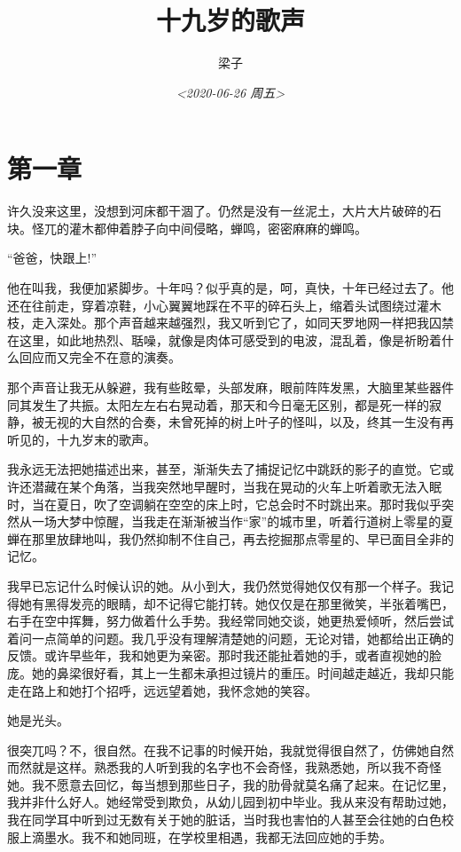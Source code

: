 \documentclass[lang=cn]{elegantpaper}
\author{梁子}
\date{\textit{<2020-06-26 周五>}}
\title{十九岁的歌声}
\begin{document}
\maketitle
\tableofcontents




\section{第一章}
\label{sec:orgef9c603}

许久没来这里，没想到河床都干涸了。仍然是没有一丝泥土，大片大片破碎的石块。怪兀的灌木都伸着脖子向中间侵略，蝉鸣，密密麻麻的蝉鸣。

“爸爸，快跟上!”

他在叫我，我便加紧脚步。十年吗？似乎真的是，呵，真快，十年已经过去了。他还在往前走，穿着凉鞋，小心翼翼地踩在不平的碎石头上，缩着头试图绕过灌木枝，走入深处。那个声音越来越强烈，我又听到它了，如同天罗地网一样把我囚禁在这里，如此地热烈、聒噪，就像是肉体可感受到的电波，混乱着，像是祈盼着什么回应而又完全不在意的演奏。

那个声音让我无从躲避，我有些眩晕，头部发麻，眼前阵阵发黑，大脑里某些器件同其发生了共振。太阳左左右右晃动着，那天和今日毫无区别，都是死一样的寂静，被无视的大自然的合奏，未曾死掉的树上叶子的怪叫，以及，终其一生没有再听见的，十九岁末的歌声。

我永远无法把她描述出来，甚至，渐渐失去了捕捉记忆中跳跃的影子的直觉。它或许还潜藏在某个角落，当我突然地早醒时，当我在晃动的火车上听着歌无法入眠时，当在夏日，吹了空调躺在空空的床上时，它总会时不时跳出来。那时我似乎突然从一场大梦中惊醒，当我走在渐渐被当作“家”的城市里，听着行道树上零星的夏蝉在那里放肆地叫，我仍然抑制不住自己，再去挖掘那点零星的、早已面目全非的记忆。

我早已忘记什么时候认识的她。从小到大，我仍然觉得她仅仅有那一个样子。我记得她有黑得发亮的眼睛，却不记得它能打转。她仅仅是在那里微笑，半张着嘴巴，右手在空中挥舞，努力做着什么手势。我经常同她交谈，她更热爱倾听，然后尝试着问一点简单的问题。我几乎没有理解清楚她的问题，无论对错，她都给出正确的反馈。或许早些年，我和她更为亲密。那时我还能扯着她的手，或者直视她的脸庞。她的鼻梁很好看，其上一生都未承担过镜片的重压。时间越走越近，我却只能走在路上和她打个招呼，远远望着她，我怀念她的笑容。

她是光头。

很突兀吗？不，很自然。在我不记事的时候开始，我就觉得很自然了，仿佛她自然而然就是这样。熟悉我的人听到我的名字也不会奇怪，我熟悉她，所以我不奇怪她。我不愿意去回忆，每当想到那些日子，我的肋骨就莫名痛了起来。在记忆里，我并非什么好人。她经常受到欺负，从幼儿园到初中毕业。我从来没有帮助过她，我在同学耳中听到过无数有关于她的脏话，当时我也害怕的人甚至会往她的白色校服上滴墨水。我不和她同班，在学校里相遇，我都无法回应她的手势。
\end{document}
